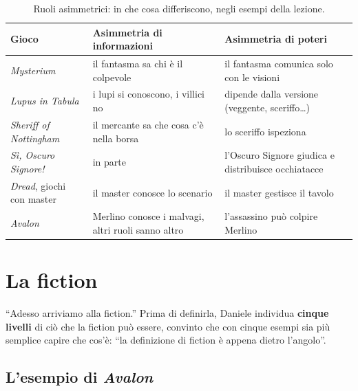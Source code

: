 \begin{table}[htbp]
\centering
\small
\caption{Ruoli asimmetrici: in che cosa differiscono, negli esempi della lezione.}
\label{a16:tab:asimmetria}
\begin{tabular}{@{}>{\raggedright\arraybackslash}p{3.4cm}>{\raggedright\arraybackslash}p{5.0cm}>{\raggedright\arraybackslash}p{5.0cm}@{}}
\toprule
\textbf{Gioco} & \textbf{Asimmetria di informazioni} & \textbf{Asimmetria di poteri} \\
\midrule
\emph{Mysterium} & il fantasma sa chi è il colpevole & il fantasma comunica solo con le
  visioni \\
\emph{Lupus in Tabula} & i lupi si conoscono, i villici no & dipende dalla versione
  (veggente, sceriffo\ldots) \\
\emph{Sheriff of Nottingham} & il mercante sa che cosa c'è nella borsa & lo sceriffo ispeziona \\
\emph{Sì, Oscuro Signore!} & in parte & l'Oscuro Signore giudica e distribuisce occhiatacce \\
\emph{Dread}, giochi con master & il master conosce lo scenario & il master gestisce il tavolo \\
\emph{Avalon} & Merlino conosce i malvagi, altri ruoli sanno altro & l'assassino può
  colpire Merlino \\
\bottomrule
\end{tabular}
\end{table}

\section{La fiction}
\label{a16:sec:fiction}



``Adesso arriviamo alla fiction.'' Prima di definirla, Daniele individua \textbf{cinque livelli}
di ciò che la fiction può essere, convinto che con cinque esempi sia più semplice capire che cos'è:
``la definizione di fiction è appena dietro l'angolo''.

\subsection{L'esempio di \emph{Avalon}}

